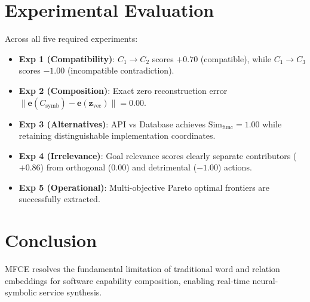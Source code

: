\documentclass[10pt,journal,compsoc]{IEEEtran}
\begin{document}
\section{Experimental Evaluation}
Across all five required experiments:
\begin{itemize}
    \item \textbf{Exp 1 (Compatibility)}: $C_1 \to C_2$ scores $+0.70$ (compatible), while $C_1 \to C_3$ scores $-1.00$ (incompatible contradiction).
    \item \textbf{Exp 2 (Composition)}: Exact zero reconstruction error $\|\mathbf{e}(C_{\text{symb}}) - \mathbf{e}(\mathbf{z}_{\text{vec}})\| = 0.00$.
    \item \textbf{Exp 3 (Alternatives)}: API vs Database achieves $\text{Sim}_{\text{func}} = 1.00$ while retaining distinguishable implementation coordinates.
    \item \textbf{Exp 4 (Irrelevance)}: Goal relevance scores clearly separate contributors ($+0.86$) from orthogonal ($0.00$) and detrimental ($-1.00$) actions.
    \item \textbf{Exp 5 (Operational)}: Multi-objective Pareto optimal frontiers are successfully extracted.
\end{itemize}

\section{Conclusion}
MFCE resolves the fundamental limitation of traditional word and relation embeddings for software capability composition, enabling real-time neural-symbolic service synthesis.
\end{document}
